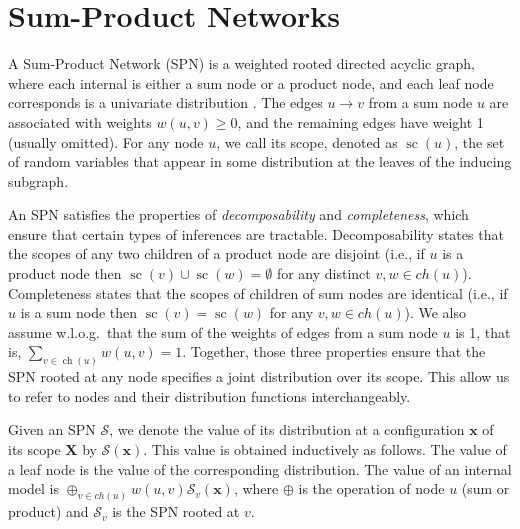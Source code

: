 \documentclass[accepted]{tpm2023} %
\DeclareMathOperator*{\ch}{ch}
\DeclareMathOperator*{\scope}{sc}
\begin{document}

\section{Sum-Product Networks}
\label{sec:fundamentals}

A Sum-Product Network (SPN) is a weighted rooted directed acyclic graph, where each internal is either a sum node or a product node, and each leaf node corresponds is a univariate distribution \citep{Gens2013}.
The edges $u \rightarrow v$ from a sum node $u$ are associated with weights $w(u, v) \geq 0 $, and the remaining edges have weight 1 (usually omitted).
For any node $u$, we call its scope, denoted as $\scope(u)$, the set of random variables that appear in some distribution at the leaves of the inducing subgraph.

An SPN satisfies the properties of \emph{decomposability} and \emph{completeness}, which ensure that certain types of inferences are tractable.
Decomposability states that the scopes of any two children of a product node are disjoint (i.e., if $u$ is a product node then $\scope(v) \cup \scope(w) = \emptyset$ for any distinct $v,w \in ch(u)$).
Completeness states that the scopes of children of sum nodes are identical (i.e., if $u$ is a sum node then $\scope(v) = \scope(w)$ for any $v,w \in ch(u)$).
We also assume w.l.o.g.\ that the sum of the weights of edges from a sum node $u$ is 1, that is, $\sum_{v \in \ch(u)} w(u, v) = 1$.
Together, those three properties ensure that the SPN rooted at any node specifies a joint distribution over its scope.
This allow us to refer to nodes and their distribution functions interchangeably.


Given an SPN $\mathcal{S}$, we denote the value of its distribution at a configuration $\mathbf{x}$ of its scope $\mathbf{X}$ by $\mathcal{S}(\mathbf{x})$.
This value is obtained inductively as follows.
The value of a leaf node is the value of the corresponding distribution.
The value of an internal model is $\oplus_{v \in ch(u)} w(u,v) \mathcal{S}_v(\mathbf{x})$, where $\oplus$ is the operation of node $u$ (sum or product) and $\mathcal{S}_v$ is the SPN rooted at $v$.
\end{document}
